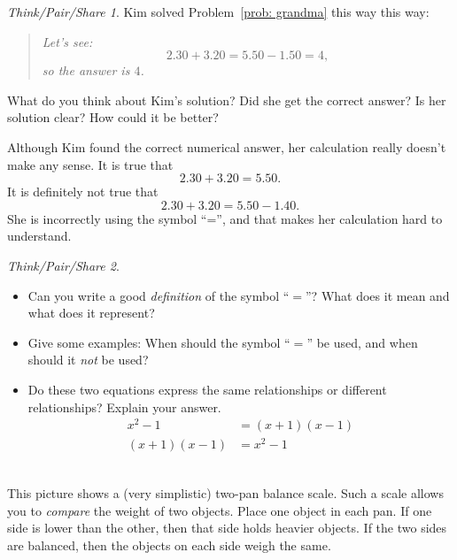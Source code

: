 \documentclass[12pt, reqno]{amsart}
\theoremstyle{remark}
\newtheorem*{thinkpair*}{Think/Pair/Share}
\theoremstyle{definition}
\numberwithin{equation}{section}  %
\begin{document}
\bigskip
\bigskip


\begin{thinkpair*}
Kim solved Problem~\ref{prob: grandma} this way this way:

\begin{quote}
\emph{
Let's see:
\[
2.30 + 3.20 = 5.50 - 1.50 = 4, 
\]
 so the answer is $4$.}
\end{quote}
What do you think about Kim's solution?  Did she get the correct answer?  Is her solution clear?  How could it be better?
\end{thinkpair*}

\bigskip
\bigskip

Although Kim found the correct numerical answer, her calculation really doesn't make any sense.  It is true that
\[
2.30 + 3.20 = 5.50.
\]
It is definitely not true that 
\[
2.30 + 3.20 = 5.50 - 1.40.
\]
She is incorrectly using the symbol ``='', and that makes her calculation hard to understand.  


\bigskip
\bigskip

\begin{thinkpair*}\ 
\begin{itemize}
\item
Can you write a good \emph{definition} of the symbol ``$=$''?  What does it mean and what does it represent?  \\

\item
Give some examples: When should the symbol ``$=$'' be used, and when should it \emph{not} be used?\\

\item
Do these two equations express the same relationships or different relationships?  Explain your answer.
\begin{align}
x^2 - 1 & = (x+1)(x-1)\\
(x+1)(x-1)  & = x^2 - 1
\end{align}\\

\end{itemize}
\end{thinkpair*}

\bigskip


This picture shows a (very simplistic) two-pan balance scale.  Such a scale allows you to \emph{compare} the weight of two objects.  Place one object in each pan.  If one side is lower than the other, then that side holds heavier objects.  If the two sides are balanced, then the objects on each side weigh the same.
\end{document}
